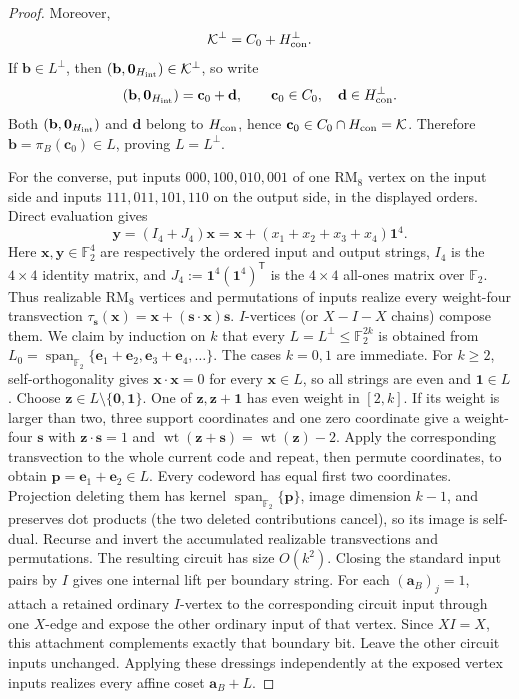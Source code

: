 \documentclass[11pt,letterpaper,onecolumn]{article}
\theoremstyle{plain}
\theoremstyle{definition}
\theoremstyle{remark}
\newcommand{\Ftwo}{\mathbb F_2}
\newcommand{\Span}{\operatorname{span}}
\newcommand{\wt}{\operatorname{wt}}
\newcommand{\one}{\mathbf 1}
\newcommand{\zero}{\mathbf 0}
\newcommand{\RMcore}{\mathrm{RM}_8}
\begin{document}
\begin{proof}
Moreover,
\[
 \mathcal K^\perp=C_0+H_{\rm con}^\perp.
\]
If \({\mathbf{b}}\in L^\perp\), then
\(({\mathbf{b}},\mathbf 0_{H_{\rm int}})\in\mathcal K^\perp\), so write
\[
 ({\mathbf{b}},\mathbf 0_{H_{\rm int}})={\mathbf{c}}_0+{\mathbf{d}},
 \qquad
 {\mathbf{c}}_0\in C_0,\quad {\mathbf{d}}\in H_{\rm con}^\perp.
\]
Both \(({\mathbf{b}},\mathbf 0_{H_{\rm int}})\) and \({\mathbf{d}}\) belong to
\(H_{\rm con}\), hence \({\mathbf{c}}_0\in C_0\cap H_{\rm con}=\mathcal K\).
Therefore \({\mathbf{b}}=\pi_B({\mathbf{c}}_0)\in L\), proving \(L=L^\perp\).

For the converse, put inputs \(000,100,010,001\) of one \(\RMcore\)
vertex on the input side and inputs \(111,011,101,110\) on the output
side, in the displayed orders.  Direct
evaluation gives
\[
 {\mathbf{y}}=(I_4+J_4){\mathbf{x}}={\mathbf{x}}+(x_1+x_2+x_3+x_4)\one^4.
\]
Here \({\mathbf{x}},{\mathbf{y}}\in\Ftwo^4\) are respectively the ordered input and output strings,
\(I_4\) is the \(4\times4\) identity matrix, and
\(J_4:=\one^4(\one^4)^{\mathsf T}\) is the \(4\times4\) all-ones matrix over
\(\Ftwo\).
Thus realizable \(\RMcore\) vertices and permutations of inputs realize every weight-four
transvection \(\tau_{\mathbf{s}}({\mathbf{x}})={\mathbf{x}}+({\mathbf{s}}\cdot {\mathbf{x}}){\mathbf{s}}\). \(I\)-vertices (or
\(X-I-X\) chains) compose them.  We claim by induction on \(k\) that every
\(L=L^\perp\le\Ftwo^{2k}\) is obtained from
 \(L_0=\Span_{\Ftwo}\{{\mathbf{e}}_1+{\mathbf{e}}_2,{\mathbf{e}}_3+{\mathbf{e}}_4,\ldots\}\).  The cases \(k=0,1\) are
immediate.  For \(k\ge2\), self-orthogonality gives \({\mathbf{x}}\cdot {\mathbf{x}}=0\) for
every \({\mathbf{x}}\in L\), so all strings are even and \(\one\in L\).  Choose
\({\mathbf{z}}\in L\setminus\{\zero,\one\}\). One of \({\mathbf{z}},{\mathbf{z}}+\one\) has even weight in
\([2,k]\).  If its weight is larger than two, three support coordinates and
one zero coordinate give a weight-four \({\mathbf{s}}\) with \({\mathbf{z}}\cdot {\mathbf{s}}=1\) and
\(\wt({\mathbf{z}}+{\mathbf{s}})=\wt({\mathbf{z}})-2\).  Apply the corresponding transvection to the whole
current code and repeat, then permute coordinates, to obtain
\({\mathbf{p}}={\mathbf{e}}_1+{\mathbf{e}}_2\in L\).  Every codeword has equal first two coordinates.
 Projection deleting them has kernel \(\Span_{\Ftwo}\{{\mathbf{p}}\}\), image dimension
\(k-1\), and preserves dot products (the two deleted contributions cancel),
so its image is self-dual.  Recurse and invert the accumulated realizable
transvections and permutations.  The resulting circuit has size \(O(k^2)\).
Closing the standard input pairs by \(I\) gives one internal lift per
boundary string.  For each \(({\mathbf{a}}_B)_j=1\), attach a retained ordinary
\(I\)-vertex to the corresponding circuit input through one \(X\)-edge and expose the other ordinary input of that vertex.  Since
\(XI=X\), this attachment complements exactly that boundary bit.
Leave the other circuit inputs unchanged. Applying these dressings
independently at the exposed vertex inputs realizes every affine coset
\({\mathbf{a}}_B+L\).
\end{proof}
\end{document}
